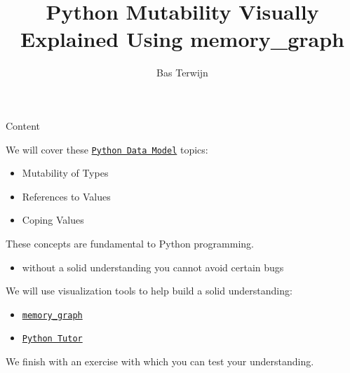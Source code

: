 \documentclass[10pt, colorlinks=true, urlcolor=blue]{beamer}
\title{Python Mutability Visually Explained Using memory\_graph}
\author{Bas Terwijn}
\date{}
\begin{document}
\begin{frame}
    \titlepage
\end{frame}

\begin{frame}{Content}

  We will cover these \href{https://docs.python.org/3/reference/datamodel.html}{\texttt{Python Data Model}} topics:
  \begin{itemize}
  \item Mutability of Types
  \item References to Values
  \item Coping Values
  \end{itemize}

  \vspace{2em}
  
  These concepts are fundamental to Python programming.
  \begin{itemize}
    \item without a solid understanding you cannot avoid certain bugs
  \end{itemize}

  \vspace{2em}
  
  We will use visualization tools to help build a solid understanding:
  \begin{itemize}
  \item \href{https://pypi.org/project/memory-graph/}{\texttt{memory\_graph}}
  \item \href{https://pythontutor.com/}{\texttt{Python Tutor}}
  \end{itemize}

  \vspace{2em}

  We finish with an exercise with which you can test your understanding.
\end{frame}
\end{document}
